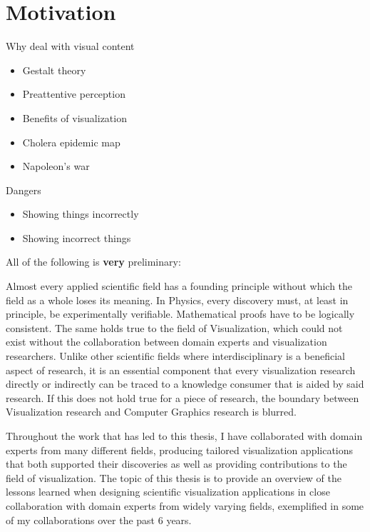 \chapter{Motivation}
\label{ch:motivation}

Why deal with visual content
\begin{itemize}
\item Gestalt theory
\item Preattentive perception
\item Benefits of visualization
\item \cite{tufte1991envisioning} Cholera epidemic map
\item Napoleon's war
\end{itemize}

Dangers
\begin{itemize}
\item Showing things incorrectly
\item Showing incorrect things
\end{itemize}

All of the following is \textbf{very} preliminary:


 Almost every applied scientific field has a founding principle without which the field as a whole loses its meaning. In Physics, every discovery must, at least in principle, be experimentally verifiable. Mathematical proofs have to be logically consistent. The same holds true to the field of Visualization, which could not exist without the collaboration between domain experts and visualization researchers. Unlike other scientific fields where interdisciplinary is a beneficial aspect of research, it is an essential component that every visualization research directly or indirectly can be traced to a knowledge consumer that is aided by said research. If this does not hold true for a piece of research, the boundary between Visualization research and Computer Graphics research is blurred.

Throughout the work that has led to this thesis, I have collaborated with domain experts from many different fields, producing tailored visualization applications that both supported their discoveries as well as providing contributions to the field of visualization. The topic of this thesis is to provide an overview of the lessons learned when designing scientific visualization applications in close collaboration with domain experts from widely varying fields, exemplified in some of my collaborations over the past 6 years.

